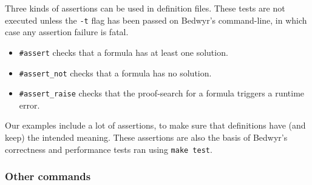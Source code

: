 Three kinds of assertions can be used in definition files.  These tests
are not executed unless the \verb.-t. flag has been passed on Bedwyr's
command-line, in which case any assertion failure is fatal.
\begin{itemize}
  \item \lstinline{#assert} checks that a formula has at least one
    solution.

  \item \lstinline{#assert_not} checks that a formula has no solution.

  \item \lstinline{#assert_raise} checks that the proof-search for a
    formula triggers a runtime error.
\end{itemize}

Our examples include a lot of assertions, to make sure that definitions
have (and keep) the intended meaning.  These assertions are also the
basis of Bedwyr's correctness and performance tests ran using
\verb.make test..

\subsubsection{Other commands}

